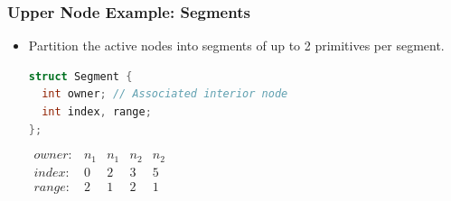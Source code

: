 \documentclass{beamer}
\begin{document}

\begin{frame}[fragile]
  \frametitle{Upper Node Example: Segments}
  \begin{itemize}
  \item Partition the active nodes into segments of up to 2 primitives per
    segment.\\
  \begin{lstlisting}[language=C++]
struct Segment {
  int owner; // Associated interior node
  int index, range;
};
    \end{lstlisting}

    $\begin{array}{lcccc}
      owner: & n_1 & n_1 & n_2 & n_2 \\
      index: & 0 & 2 & 3 & 5 \\
      range: & 2 & 1 & 2 & 1 \\
    \end{array}$
  \end{itemize}
\end{frame}
\end{document}
